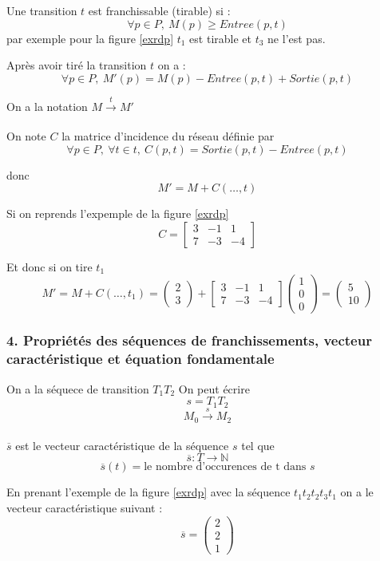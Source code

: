 \documentclass[12pt,a4paper,oneside]{article}
\begin{document}
	Une transition $t$ est franchissable (tirable) si :
	$$\forall p \in P,\ M(p) \geq Entree(p,t)$$
	par exemple pour la figure \ref{exrdp} $t_1$ est tirable et $t_3$ ne l'est pas.

	Après avoir tiré la transition $t$ on a :
	$$\forall p \in P,\ M'(p) = M(p) - Entree(p,t) + Sortie(p,t)$$

	On a la notation $M \xrightarrow[]{t} M'$

	On note $C$ la matrice d'incidence du réseau définie par
	$$\forall p \in P,\ \forall t \in t,\ C(p,t) = Sortie(p,t) - Entree(p,t)$$

	donc
	$$M' = M + C(\dots,t)$$

	Si on reprends l'expemple de la figure \ref{exrdp}
	$$C = \begin{bmatrix}
		3 & -1 & 1 \\
		7 & -3 & -4
	\end{bmatrix}$$

	Et donc si on tire $t_1$
	$$M' = M + C(\dots,t_1) =
	\begin{pmatrix}
		2\\
		3
	\end{pmatrix}
	+
	\begin{bmatrix}
		3 & -1 & 1 \\
		7 & -3 & -4
	\end{bmatrix}
	\begin{pmatrix}
		1\\
		0\\
		0
	\end{pmatrix}
	=
	\begin{pmatrix}
		5\\
		10
	\end{pmatrix}
	$$

	\subsubsection*{4. Propriétés des séquences de franchissements, vecteur caractéristique et équation fondamentale}

		On a la séquece de transition $T_1T_2$ On peut écrire
		$$s = T_1T_2$$
		$$M_0 \xrightarrow[]{s} M_2$$

		$\overline{s}$ est le vecteur caractéristique de la séquence $s$ tel que
		$$\overline{s}: T \rightarrow \mathbb{N}$$
		$$\overline{s}(t) = \textrm{le nombre d'occurences de t dans } s$$

		En prenant l'exemple de la figure \ref{exrdp} avec la séquence $t_1t_2t_2t_3t_1$ on a le vecteur caractéristique suivant :
		$$\overline{s} = \begin{pmatrix}
			2\\
			2\\
			1
		\end{pmatrix}$$
\end{document}
